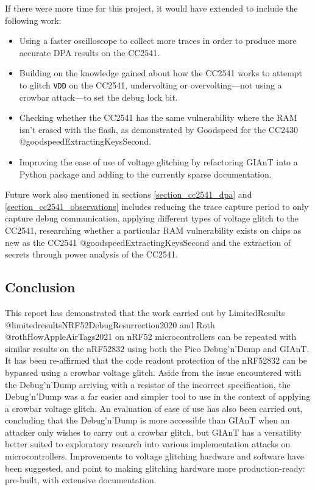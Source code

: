 If there were more time for this project, it would have extended to
include the following work:

\begin{itemize}
\tightlist
\item
  Using a faster oscilloscope to collect more traces in order to produce
  more accurate DPA results on the CC2541.
\item
  Building on the knowledge gained about how the CC2541 works to attempt
  to glitch \texttt{VDD} on the CC2541, undervolting or
  overvolting---not using a crowbar attack---to set the debug lock bit.
\item
  Checking whether the CC2541 has the same vulnerability where the RAM
  isn't erased with the flash, as demonstrated by Goodspeed for the
  CC2430 @goodspeedExtractingKeysSecond.
\item
  Improving the ease of use of voltage glitching by refactoring GIAnT
  into a Python package and adding to the currently sparse
  documentation.
\end{itemize}

Future work also mentioned in sections \ref{section_cc2541_dpa} and
\ref{section_cc2541_observations} includes reducing the trace capture
period to only capture debug communication, applying different types of
voltage glitch to the CC2541, researching whether a particular RAM
vulnerability exists on chips as new as the CC2541
@goodspeedExtractingKeysSecond and the extraction of secrets through
power analysis of the CC2541.

\hypertarget{conclusion}{%
\subsection{Conclusion}\label{conclusion}}

This report has demonstrated that the work carried out by LimitedResults
@limitedresultsNRF52DebugResurrection2020 and Roth
@rothHowAppleAirTags2021 on nRF52 microcontrollers can be repeated with
similar results on the nRF52832 using both the Pico Debug'n'Dump and
GIAnT. It has been re-affirmed that the code readout protection of the
nRF52832 can be bypassed using a crowbar voltage glitch. Aside from the
issue encountered with the Debug'n'Dump arriving with a resistor of the
incorrect specification, the Debug'n'Dump was a far easier and simpler
tool to use in the context of applying a crowbar voltage glitch. An
evaluation of ease of use has also been carried out, concluding that the
Debug'n'Dump is more accessible than GIAnT when an attacker only wishes
to carry out a crowbar glitch, but GIAnT has a versatility better suited
to exploratory research into various implementation attacks on
microcontrollers. Improvements to voltage glitching hardware and
software have been suggested, and point to making glitching hardware
more production-ready: pre-built, with extensive documentation.

